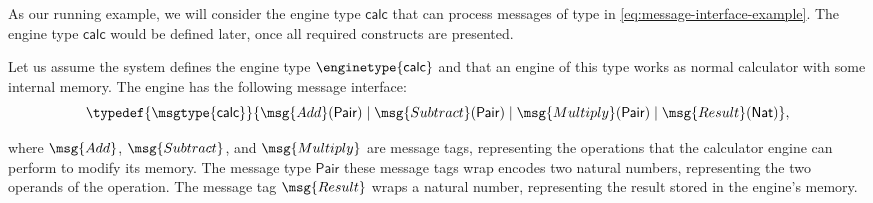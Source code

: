 
As our running example, we will consider the engine type $\mathsf{calc}$ that
can process messages of type in \eqref{eq:message-interface-example}. The engine
type $\mathsf{calc}$ would be defined later, once all required constructs are
presented.

\begin{example}\label{ex:calculator-engine}%
  Let us assume the system defines the engine type $\enginetype{\mathsf{calc}}$
  and that an engine of this type works as normal calculator with some internal
  memory. The engine has the following message interface:
  \begin{equation}\label{eq:message-interface-example}
  \typedef%
  {\msgtype{\mathsf{calc}}}%
  {    \msg{Add}(\mathsf{Pair}) 
  \mid \msg{Subtract}(\mathsf{Pair}) 
  \mid \msg{Multiply}(\mathsf{Pair})
  \mid \msg{Result}(\mathsf{Nat})
  },
\end{equation}

where $\msg{Add}$, $\msg{Subtract}$, and $\msg{Multiply}$ are message tags, representing
the operations that the calculator engine can perform to modify its memory. The
message type $\mathsf{Pair}$ these message tags wrap encodes two natural numbers,
representing the two operands of the operation. The message tag $\msg{Result}$ wraps
a natural number, representing the result stored in the engine's memory.
\end{example}